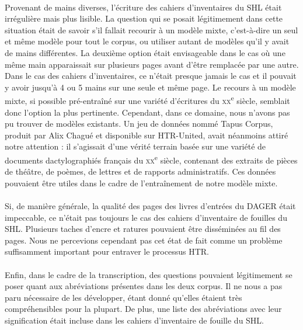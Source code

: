 \documentclass[a4paper,12pt,twoside]{book}
\begin{document}
\paragraph{}
Provenant de mains diverses, l’écriture des cahiers d’inventaires du SHL était irrégulière mais plus lisible. La question qui se posait légitimement dans cette situation était de savoir s'il fallait recourir à un modèle mixte, c’est-à-dire un seul et même modèle pour tout le corpus, ou utiliser autant de modèles qu’il y avait de mains différentes. La deuxième option était envisageable dans le cas où une même main apparaissait sur plusieurs pages avant d'être remplacée par une autre. Dans le cas des cahiers d’inventaires, ce n’était presque jamais le cas et il pouvait y avoir jusqu’à 4 ou 5 mains sur une seule et même page. Le recours à un modèle mixte, si possible pré-entraîné sur une variété d’écritures du \textsc{xx}\textsuperscript{e} siècle, semblait donc l’option la plus pertinente. Cependant, dans ce domaine, nous n’avons pas pu trouver de modèles existants. Un jeu de données nommé Tapus Corpus, produit par Alix Chagué et disponible sur HTR-United, avait néanmoins attiré notre attention : il s’agissait d’une vérité terrain basée sur une variété de documents dactylographiés français du \textsc{xx}\textsuperscript{e} siècle, contenant des extraits de pièces de théâtre, de poèmes, de lettres et de rapports administratifs. Ces données pouvaient être utiles dans le cadre de l'entraînement de notre modèle mixte.

\paragraph{}
Si, de manière générale, la qualité des pages des livres d’entrées du DAGER était impeccable, ce n’était pas toujours le cas des cahiers d’inventaire de fouilles du SHL. Plusieurs taches d’encre et ratures pouvaient être disséminées au fil des pages. Nous ne percevions cependant pas cet état de fait comme un problème suffisamment important pour entraver le processus HTR.

\paragraph{}
Enfin, dans le cadre de la transcription, des questions pouvaient légitimement se poser quant aux abréviations présentes dans les deux corpus. Il ne nous a pas paru nécessaire de les développer, étant donné qu’elles étaient très compréhensibles pour la plupart. De plus, une liste des abréviations avec leur signification était incluse dans les cahiers d’inventaire de fouille du SHL.
		
\end{document}
